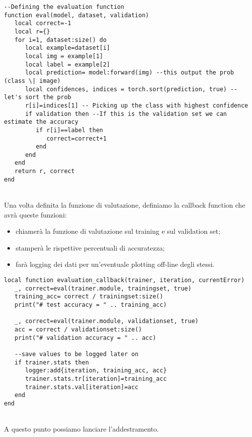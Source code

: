 \begin{lstlisting}[language={[5.2]Lua}]
--Defining the evaluation function
function eval(model, dataset, validation)
   local correct=-1
   local r={}
   for i=1, dataset:size() do
      local example=dataset[i]
      local img = example[1]
      local label = example[2]
      local prediction= model:forward(img) --this output the prob (class \| image)
      local confidences, indices = torch.sort(prediction, true) -- let's sort the prob
      r[i]=indices[1] -- Picking up the class with highest confidence
      if validation then --If this is the validation set we can estimate the accuracy
         if r[i]==label then
            correct=correct+1
         end
      end
   end
   return r, correct
end
\end{lstlisting}
\\
Una volta definita la funzione di valutazione, definiamo la callback function che avrà queste funzioni: 
\begin{itemize}
\item chiamerà la funzione di valutazione sul training e sul validation set; 
\item stamperà le rispettive percentuali di accuratezza; 
\item farà logging dei dati per un'eventuale plotting off-line degli stessi.
\end{itemize} 

\begin{lstlisting}[language={[5.2]Lua}]
local function evaluation_callback(trainer, iteration, currentError)
   _, correct=eval(trainer.module, trainingset, true)
   training_acc= correct / trainingset:size()
   print("# test accuracy = " .. training_acc)

   _, correct=eval(trainer.module, validationset, true)
   acc = correct / validationset:size()
   print("# validation accuracy = " .. acc)

   --save values to be logged later on
   if trainer.stats then
      logger:add{iteration, training_acc, acc}
      trainer.stats.tr[iteration]=training_acc
      trainer.stats.val[iteration]=acc
   end
end
\end{lstlisting}
\\
A questo punto possiamo lanciare l'addestramento.

